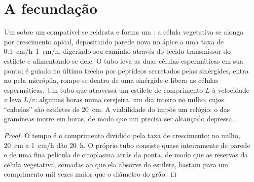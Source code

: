 \section{A fecundação}

\begin{theorem}\label{thm:b2:angiosperm-reproduction:tube}
Um  sobre um  compatível se reidrata e forma um
\emph{}: a célula vegetativa se alonga por crescimento
apical, depositando parede nova no ápice a uma taxa de
\qtyrange{0.1}{1}{cm/h}, digerindo seu caminho através do tecido
transmissor do estilete e alimentando-se dele. O tubo leva as duas
células espermáticas em sua ponta; é guiado no último trecho por
peptídeos secretados pelas sinérgides, entra no  pela micrópila,
rompe-se dentro de uma sinérgide e libera as células espermáticas. Um
tubo que atravessa um estilete de comprimento $L$ à velocidade $v$
leva $L/v$: algumas horas numa cerejeira, um dia inteiro no milho,
cujos ``cabelos'' são estiletes de \qty{20}{cm}. A viabilidade do 
impõe um relógio: o  das gramíneas morre em horas, de modo que um
 precisa ser alcançado depressa.
\end{theorem}
\begin{proof}
O tempo é o comprimento dividido pela taxa de crescimento; no milho,
\qty{20}{cm} a \qty{1}{cm/h} dão \qty{20}{h}. O próprio tubo consiste
quase inteiramente de parede e de uma fina película de citoplasma
atrás da ponta, de modo que as reservas da célula vegetativa, somadas
ao que ela absorve do estilete, bastam para um comprimento mil vezes
maior que o diâmetro do grão.
\end{proof}

